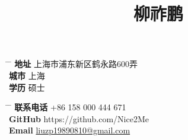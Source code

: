 \documentclass[10pt]{article} %
\begin{document}

\title{柳祚鹏} %


\parbox{0.5\textwidth}{ %
\begin{tabbing} %
\hspace{3cm} \= \hspace{4cm} \= \kill %
{\bf 地址} \> 上海市浦东新区鹤永路600弄\\ %
{\bf 城市}\> 上海 \\ %
{\bf 学历} \> 硕士 \\ %
\end{tabbing}}
\hfill %
\parbox{0.5\textwidth}{ %
\begin{tabbing} %
\hspace{3cm} \= \hspace{4cm} \= \kill %
{\bf 联系电话} \> +86 158 000 444 671 \\ %
{\bf GitHub} \> https://github.com/Nice2Me \\
{\bf Email} \> \href{mailto:liuzp19890810@gmail.com}{liuzp19890810@gmail.com} \\ %
\end{tabbing}}


%
\end{document}

